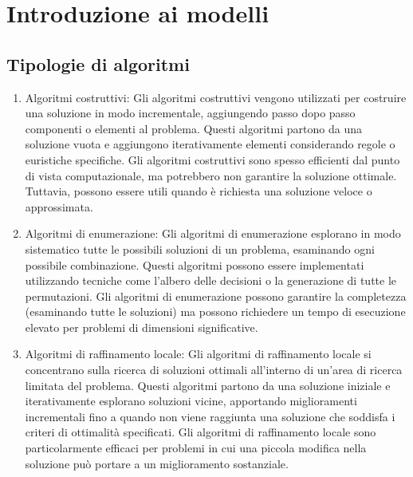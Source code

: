 \chapter{Introduzione ai modelli}
\section{Tipologie di algoritmi}

\begin{enumerate}
  \item Algoritmi costruttivi: Gli algoritmi costruttivi vengono utilizzati per costruire una soluzione in modo incrementale, aggiungendo passo dopo passo componenti o elementi al problema. Questi algoritmi partono da una soluzione vuota e aggiungono iterativamente elementi considerando regole o euristiche specifiche. Gli algoritmi costruttivi sono spesso efficienti dal punto di vista computazionale, ma potrebbero non garantire la soluzione ottimale. Tuttavia, possono essere utili quando è richiesta una soluzione veloce o approssimata.
  \item Algoritmi di enumerazione: Gli algoritmi di enumerazione esplorano in modo sistematico tutte le possibili soluzioni di un problema, esaminando ogni possibile combinazione. Questi algoritmi possono essere implementati utilizzando tecniche come l'albero delle decisioni o la generazione di tutte le permutazioni. Gli algoritmi di enumerazione possono garantire la completezza (esaminando tutte le soluzioni) ma possono richiedere un tempo di esecuzione elevato per problemi di dimensioni significative.
  \item Algoritmi di raffinamento locale: Gli algoritmi di raffinamento locale si concentrano sulla ricerca di soluzioni ottimali all'interno di un'area di ricerca limitata del problema. Questi algoritmi partono da una soluzione iniziale e iterativamente esplorano soluzioni vicine, apportando miglioramenti incrementali fino a quando non viene raggiunta una soluzione che soddisfa i criteri di ottimalità specificati. Gli algoritmi di raffinamento locale sono particolarmente efficaci per problemi in cui una piccola modifica nella soluzione può portare a un miglioramento sostanziale.
\end{enumerate}

